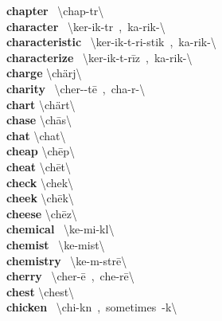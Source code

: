 \documentclass[10pt,a4paper]{article}
\begin{document}
\begin{multicols}{2}
\textbf{ chapter }\quad \ \textbackslash \textprimstress chap-t\textschwa r\textbackslash \\
\textbf{ character }\quad \ \textbackslash \textprimstress ker-ik-t\textschwa r\ ,\ \textprimstress ka-rik-\textbackslash \\
\textbf{ characteristic }\quad \ \textbackslash \textsecstress ker-ik-t\textschwa -\textprimstress ri-stik\ ,\ \textsecstress ka-rik-\textbackslash \\
\textbf{ characterize }\quad \ \textbackslash \textprimstress ker-ik-t\textschwa -\textsecstress r\={i}z\ ,\ \textprimstress ka-rik-\textbackslash \\
\textbf{ charge }\quad \textbackslash \textprimstress ch\"{a}rj\textbackslash \\
\textbf{ charity }\quad \ \textbackslash \textprimstress cher-\textschwa -t\={e}\ ,\ \textprimstress cha-r\textschwa -\textbackslash \\
\textbf{ chart }\quad \textbackslash \textprimstress ch\"{a}rt\textbackslash \\
\textbf{ chase }\quad \textbackslash \textprimstress ch\={a}s\textbackslash \\
\textbf{ chat }\quad \textbackslash \textprimstress chat\textbackslash \\
\textbf{ cheap }\quad \textbackslash \textprimstress ch\={e}p\textbackslash \\
\textbf{ cheat }\quad \textbackslash \textprimstress ch\={e}t\textbackslash \\
\textbf{ check }\quad \textbackslash \textprimstress chek\textbackslash \\
\textbf{ cheek }\quad \textbackslash \textprimstress ch\={e}k\textbackslash \\
\textbf{ cheese }\quad \textbackslash \textprimstress ch\={e}z\textbackslash \\
\textbf{ chemical }\quad \ \textbackslash \textprimstress ke-mi-k\textschwa l\textbackslash \\
\textbf{ chemist }\quad \ \textbackslash \textprimstress ke-mist\textbackslash \\
\textbf{ chemistry }\quad \ \textbackslash \textprimstress ke-m\textschwa -str\={e}\textbackslash \\
\textbf{ cherry }\quad \ \textbackslash \textprimstress cher-\={e}\ ,\ \textprimstress che-r\={e}\textbackslash \\
\textbf{ chest }\quad \textbackslash \textprimstress chest\textbackslash \\
\textbf{ chicken }\quad \ \textbackslash \textprimstress chi-k\textsuperscript{\textreve}n\ ,\ sometimes\ -k\textsuperscript{\textreve}\engma \textbackslash \\

\end{multicols}
\end{document}
